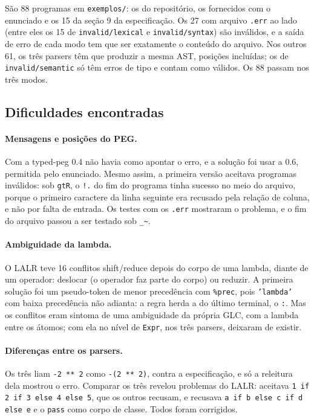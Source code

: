 \documentclass[12pt,a4paper]{article}
\begin{document}
São 88 programas em \texttt{exemplos/}: os do repositório, os
fornecidos com o enunciado e os 15 da seção 9 da especificação. Os 27
com arquivo \texttt{.err} ao lado (entre eles os 15 de
\texttt{invalid/lexical} e \texttt{invalid/syntax}) são inválidos, e a
saída de erro de cada modo tem que ser exatamente o conteúdo do
arquivo. Nos outros 61, os três parsers têm que produzir a mesma AST,
posições incluídas; os de \texttt{invalid/semantic} só têm erros de
tipo e contam como válidos. Os 88 passam nos três modos.

\subsection{Dificuldades encontradas}
\label{sec:dificuldades}

\paragraph{Mensagens e posições do PEG.} Com a typed-peg 0.4 não havia
como apontar o erro, e a solução foi usar a 0.6, permitida pelo
enunciado. Mesmo assim, a primeira versão aceitava programas inválidos:
sob \texttt{gtR}, o \texttt{!.} do fim do programa tinha sucesso no meio
do arquivo, porque o primeiro caractere da linha seguinte era recusado
pela relação de coluna, e não por falta de entrada. Os testes com os
\texttt{.err} mostraram o problema, e o fim do arquivo passou a ser
testado sob \texttt{\_\textasciitilde}.

\paragraph{Ambiguidade da lambda.} O LALR teve 16 conflitos
shift/reduce depois do corpo de uma lambda, diante de um operador:
deslocar (o operador faz parte do corpo) ou reduzir. A primeira solução
foi um pseudo-token de menor precedência com \texttt{\%prec}, pois
\texttt{'lambda'} com baixa precedência não adianta: a regra herda a do
último terminal, o \texttt{:}. Mas os conflitos eram sintoma de uma
ambiguidade da própria GLC, com a lambda entre os átomos; com ela no
nível de \texttt{Expr}, nos três parsers, deixaram de existir.

\paragraph{Diferenças entre os parsers.} Os três liam \texttt{-2 ** 2}
como \texttt{-(2 ** 2)}, contra a especificação, e só a releitura dela
mostrou o erro. Comparar os três revelou problemas do LALR: aceitava
\texttt{1 if 2 if 3 else 4 else 5}, que os outros recusam, e recusava
\texttt{a if b else c if d else e} e o \texttt{pass} como corpo de
classe. Todos foram corrigidos.
\end{document}
